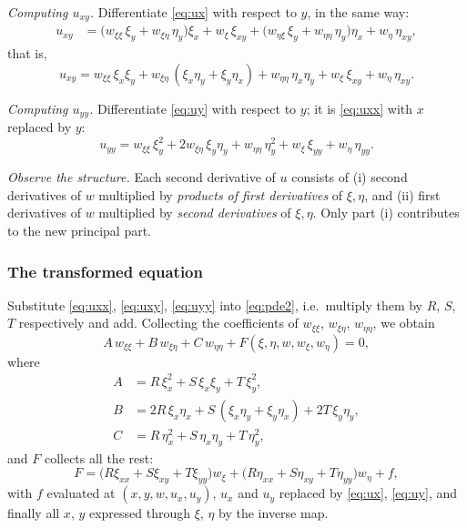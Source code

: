 \documentclass[11pt]{article}
\theoremstyle{plain}
\theoremstyle{definition}
\theoremstyle{remark}
\begin{document}
\emph{Computing $u_{xy}$.} Differentiate \eqref{eq:ux} with respect to $y$, in the same way:
\begin{align*}
u_{xy} &= \big(w_{\xi\xi}\,\xi_y + w_{\xi\eta}\,\eta_y\big)\xi_x + w_\xi\,\xi_{xy} + \big(w_{\eta\xi}\,\xi_y + w_{\eta\eta}\,\eta_y\big)\eta_x + w_\eta\,\eta_{xy},
\end{align*}
that is,
\begin{equation}\label{eq:uxy}
u_{xy} = w_{\xi\xi}\,\xi_x\xi_y + w_{\xi\eta}\,(\xi_x\eta_y + \xi_y\eta_x) + w_{\eta\eta}\,\eta_x\eta_y + w_\xi\,\xi_{xy} + w_\eta\,\eta_{xy}.
\end{equation}

\emph{Computing $u_{yy}$.} Differentiate \eqref{eq:uy} with respect to $y$; it is \eqref{eq:uxx} with $x$ replaced by $y$:
\begin{equation}\label{eq:uyy}
u_{yy} = w_{\xi\xi}\,\xi_y^2 + 2w_{\xi\eta}\,\xi_y\eta_y + w_{\eta\eta}\,\eta_y^2 + w_\xi\,\xi_{yy} + w_\eta\,\eta_{yy}.
\end{equation}

\emph{Observe the structure.} Each second derivative of $u$ consists of (i) second derivatives of $w$ multiplied by \emph{products of first derivatives} of $\xi, \eta$, and (ii) first derivatives of $w$ multiplied by \emph{second derivatives} of $\xi, \eta$. Only part (i) contributes to the new principal part.

\subsubsection{The transformed equation}
Substitute \eqref{eq:uxx}, \eqref{eq:uxy}, \eqref{eq:uyy} into \eqref{eq:pde2}, i.e.\ multiply them by $R$, $S$, $T$ respectively and add. Collecting the coefficients of $w_{\xi\xi}$, $w_{\xi\eta}$, $w_{\eta\eta}$, we obtain
\begin{equation}\label{eq:newpde}
A\,w_{\xi\xi} + B\,w_{\xi\eta} + C\,w_{\eta\eta} + F(\xi,\eta,w,w_\xi,w_\eta) = 0,
\end{equation}
where
\begin{align}
A &= R\,\xi_x^2 + S\,\xi_x\xi_y + T\,\xi_y^2, \label{eq:A}\\
B &= 2R\,\xi_x\eta_x + S\,(\xi_x\eta_y + \xi_y\eta_x) + 2T\,\xi_y\eta_y, \label{eq:B}\\
C &= R\,\eta_x^2 + S\,\eta_x\eta_y + T\,\eta_y^2, \label{eq:C}
\end{align}
and $F$ collects all the rest:
$$ F = \big(R\xi_{xx} + S\xi_{xy} + T\xi_{yy}\big)w_\xi + \big(R\eta_{xx} + S\eta_{xy} + T\eta_{yy}\big)w_\eta + f, $$
with $f$ evaluated at $(x, y, w, u_x, u_y)$, $u_x$ and $u_y$ replaced by \eqref{eq:ux}, \eqref{eq:uy}, and finally all $x$, $y$ expressed through $\xi$, $\eta$ by the inverse map.
\end{document}
